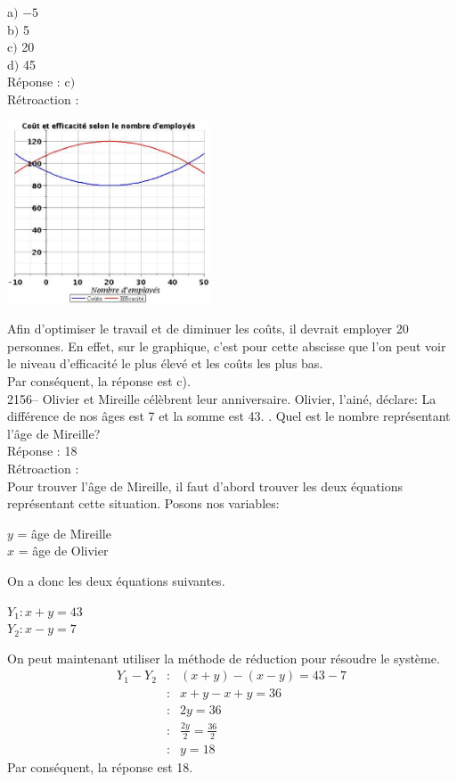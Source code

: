 \documentclass[letterpaper, 12pt]{article}
\begin{document}
a$)$ $-5$\\
b$)$ 5\\
c$)$ 20\\
d$)$ 45\\

R\'eponse : c$)$\\

R\'etroaction :\\
\begin{center}
 \includegraphics[width=6cm,bb=14 14 527 476]{Q2155.eps}
\end{center}
Afin d'optimiser le travail et de diminuer les co\^uts, il devrait employer 20 personnes. En effet, sur le graphique, c'est pour cette abscisse que l'on peut voir le niveau d'efficacit\'e le plus \'elev\'e et les co\^uts les plus bas.\\
Par cons\'equent, la r\'eponse est c).\\

2156-- Olivier et Mireille c\'el\`ebrent leur anniversaire. Olivier, l'ain\'e, d\'eclare: \og La diff\'erence de nos \^ages est 7 et la somme est 43. \fg. Quel est le nombre repr\'esentant l'\^age de Mireille? \\

R\'eponse : 18\\

R\'etroaction :\\
Pour trouver l'\^age de Mireille, il faut d'abord trouver les deux \'equations repr\'esentant cette situation. Posons nos variables:
\begin{center}
$y$ = \^age de Mireille\\
$x$ = \^age de Olivier
\end{center}
On a donc les deux \'equations suivantes.
\begin{center}
$Y_{1}:x+y=43$ \\
$Y_{2}:x-y=7$
\end{center}
On peut maintenant utiliser la m\'ethode de r\'eduction pour r\'esoudre le syst\`eme.
\begin{eqnarray*}
Y_{1}-Y_{2}&:&(x+y)-(x-y)=43-7\\
&:& x+y-x+y=36\\
&:& 2y=36\\[2mm]
&:& \frac{2y}{2}=\frac{36}{2}\\[2mm]
&:& y=18
\end{eqnarray*}
Par cons\'equent, la r\'eponse est 18.\\
\end{document}
